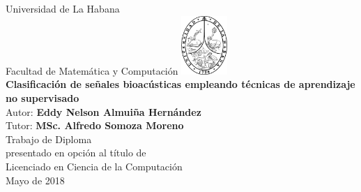 \documentclass[12pt]{report}
\begin{document}
    \begin{titlepage}
        \begin{center}
        {\large Universidad de La Habana}
            \\ Facultad de Matemática y Computación
            \vskip 0.25cm
            \includegraphics[width=1.75cm]{images/uh} \\
            \vfill
            {\LARGE \textbf{Clasificación de señales bioacústicas empleando técnicas de aprendizaje no supervisado}} \\
            \vskip 2cm
            {\Large Autor: \textbf{Eddy Nelson Almuiña Hernández}} \\
            \vskip 0.5cm
            {\Large Tutor: \textbf{MSc. Alfredo Somoza Moreno}} \\
            \vfill
            {\large Trabajo de Diploma \\presentado en opción al título de \\Licenciado en Ciencia de la Computación} \\
            \vskip 0.5cm
            \vskip 0.5cm
            Mayo de 2018
        \end{center}
    \end{titlepage}
\end{document}
